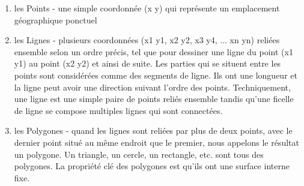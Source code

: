 \begin{enumerate} 
\item les Points - une simple coordonn\'ee (x y) qui repr\'esente un emplacement g\'eographique ponctuel 
\item les Lignes - plusieurs coordonn\'ees (x1 y1, x2 y2, x3 y4, ... xn yn) reli\'ees ensemble selon un ordre pr\'ecis, tel que pour dessiner une ligne du point (x1 y1) au point (x2 y2) et ainsi de suite. Les parties qui se situent entre les points sont consid\'er\'ees comme des segments de ligne. Ils ont une longueur et la ligne peut avoir une direction suivant l'ordre des points. Techniquement, une ligne est une simple paire de points reli\'es ensemble tandis qu'une ficelle de ligne se compose multiples lignes qui sont connect\'ees.
\item les Polygones - quand les lignes sont reli\'ees par plus de deux points, avec le dernier point situ\'e au m\^eme endroit que le premier, nous appelons le r\'esultat un polygone. Un triangle, un cercle, un rectangle, etc. sont tous des polygones. La propri\'et\'e cl\'e des polygones est qu'ils ont une surface interne fixe.
\end{enumerate}
